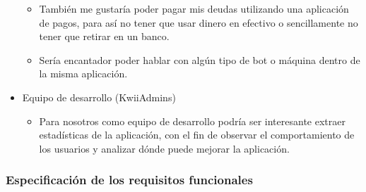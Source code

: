 \begin{itemize}
\begin{itemize}
        \item También me gustaría poder pagar mis deudas utilizando una aplicación de pagos, para así no tener que usar dinero en efectivo o sencillamente no tener que retirar en un banco.
        \item Sería encantador poder hablar con algún tipo de bot o máquina dentro de la misma aplicación.
    \end{itemize}
    \item Equipo de desarrollo (KwiiAdmins)
    \begin{itemize}
        \item Para nosotros como equipo de desarrollo podría ser interesante extraer estadísticas de la aplicación, con el fin de observar el comportamiento de los usuarios y analizar dónde puede mejorar la aplicación.
    \end{itemize}
\end{itemize}

\subsubsection{Especificación de los requisitos funcionales}

